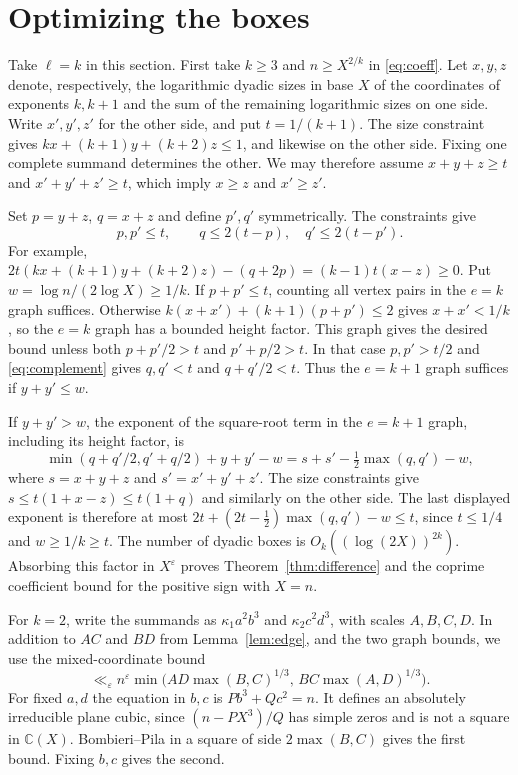 \documentclass[11pt,reqno]{amsart}
\newcommand{\eps}{\varepsilon}
\newcommand{\C}{\mathbb C}
\begin{document}
\section{Optimizing the boxes}
Take \(\ell=k\) in this section. First take \(k\ge3\) and \(n\ge X^{2/k}\) in \eqref{eq:coeff}.
Let \(x,y,z\) denote, respectively, the
logarithmic dyadic sizes in base \(X\) of the coordinates of
exponents \(k,k+1\) and the sum of the remaining logarithmic sizes
on one side. Write \(x',y',z'\) for the other side, and put
\(t=1/(k+1)\). The size constraint gives
\(kx+(k+1)y+(k+2)z\le1\), and likewise on the other side.
Fixing one complete summand determines the other. We may therefore
assume \(x+y+z\ge t\) and \(x'+y'+z'\ge t\), which imply
\(x\ge z\) and \(x'\ge z'\).

Set \(p=y+z\), \(q=x+z\) and define \(p',q'\) symmetrically.
The constraints give
\begin{equation}\label{eq:complement}
                  p,p'\le t,\qquad q\le 2(t-p),\quad q'\le2(t-p').
\end{equation}
For example, \(2t(kx+(k+1)y+(k+2)z)-(q+2p)
=(k-1)t(x-z)\ge0\). Put \(w=\log n/(2\log X)\ge1/k\).
If \(p+p'\le t\), counting all vertex pairs in the \(e=k\) graph
suffices. Otherwise \(k(x+x')+(k+1)(p+p')\le2\) gives
\(x+x'<1/k\), so the \(e=k\) graph has a bounded height factor.
This graph gives the desired bound unless both \(p+p'/2>t\)
and \(p'+p/2>t\). In that case \(p,p'>t/2\) and \eqref{eq:complement}
gives \(q,q'<t\) and \(q+q'/2<t\). Thus the \(e=k+1\) graph
suffices if \(y+y'\le w\).

If \(y+y'>w\), the exponent of the square-root term in the
\(e=k+1\) graph, including its height factor, is
\[
 \min(q+q'/2,q'+q/2)+y+y'-w
   =s+s'-\tfrac12\max(q,q')-w,
\]
where \(s=x+y+z\) and \(s'=x'+y'+z'\). The size constraints give
\(s\le t(1+x-z)\le t(1+q)\) and similarly on the other side.
The last displayed exponent is therefore at most
\(2t+(2t-\tfrac12)\max(q,q')-w\le t\), since \(t\le1/4\)
and \(w\ge1/k\ge t\).
The number of dyadic boxes is \(O_k((\log(2X))^{2k})\).
Absorbing this factor in \(X^\eps\) proves
Theorem~\ref{thm:difference} and the coprime coefficient bound
for the positive sign with \(X=n\).

For \(k=2\), write the summands as
\(\kappa_1 a^2 b^3\) and \(\kappa_2 c^2 d^3\), with scales
\(A,B,C,D\). In addition to \(AC\) and \(BD\) from
Lemma~\ref{lem:edge}, and the two graph bounds, we use the
mixed-coordinate bound
\begin{equation}\label{eq:mixed}
 \ll_\eps n^\eps\min\bigl(AD\max(B,C)^{1/3},\,
                            BC\max(A,D)^{1/3}\bigr).
\end{equation}
For fixed \(a,d\) the equation in \(b,c\) is \(P b^3+Qc^2=n\).
It defines an absolutely irreducible plane cubic, since
\((n-PX^3)/Q\) has simple zeros and is not a square in \(\C(X)\).
Bombieri--Pila \cite[Theorem~5]{BP} in a square of side
\(2\max(B,C)\) gives the first bound. Fixing \(b,c\) gives the
second.
\end{document}
